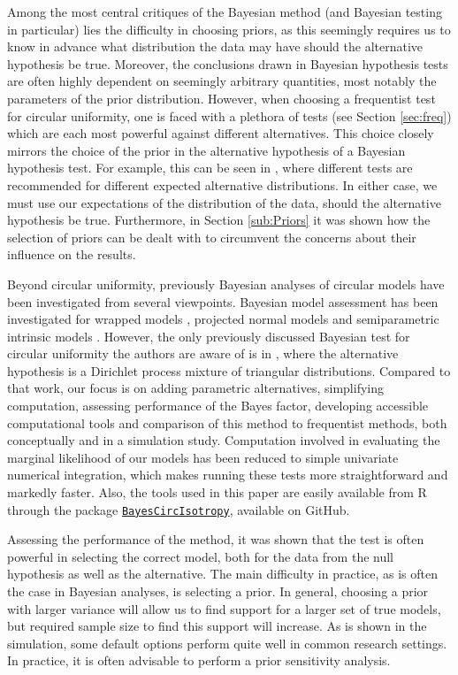 Among the most central critiques of the Bayesian method (and Bayesian testing in particular) lies the difficulty in choosing priors, as this seemingly requires us to know in advance what distribution the data may have should the alternative hypothesis be true. Moreover, the conclusions drawn in Bayesian hypothesis tests are often highly dependent on seemingly arbitrary quantities, most notably the parameters of the prior distribution. However, when choosing a frequentist test for circular uniformity, one is faced with a plethora of tests (see Section \ref{sec:freq}) which are each most powerful against different alternatives. This choice closely mirrors the choice of the prior in the alternative hypothesis of a Bayesian hypothesis test. For example, this can be seen in \citet{landler2018circular}, where different tests are recommended for different expected alternative distributions. In either case, we must use our expectations of the distribution of the data, should the alternative hypothesis be true. Furthermore, in Section \ref{sub:Priors} it was shown how the selection of priors can be dealt with to circumvent the concerns about their influence on the results. 

Beyond circular uniformity, previously Bayesian analyses of circular models have been investigated from several viewpoints. Bayesian model assessment has been investigated for wrapped models \citep{ravindran2011bayesian}, projected normal models \citep{nunez2015bayesian} and semiparametric intrinsic models \citep{bhattacharya2009bayesian, george2006semiparametric}. However, the only previously discussed Bayesian test for circular uniformity the authors are aware of is in \citet{mcvinish2008semiparametric}, where the alternative hypothesis is a Dirichlet process mixture of triangular distributions. Compared to that work, our focus is on adding parametric alternatives, simplifying computation, assessing performance of the Bayes factor, developing accessible computational tools and comparison of this method to frequentist methods, both conceptually and in a simulation study. Computation involved in evaluating the marginal likelihood of our models has been reduced to simple univariate numerical integration, which makes running these tests more straightforward and markedly faster. Also, the tools used in this paper are easily available from R through the package \href{https://github.com/LINK_BLINDED/BayesCircIsotropy}{\texttt{BayesCircIsotropy}}, available on GitHub.

Assessing the performance of the method, it was shown that the test is often powerful in selecting the correct model, both for the data from the null hypothesis as well as the alternative. The main difficulty in practice, as is often the case in Bayesian analyses, is selecting a prior. In general, choosing a prior with larger variance will allow us to find support for a larger set of true models, but required sample size to find this support will increase. As is shown in the simulation, some default options perform quite well in common research settings. In practice, it is often advisable to perform a prior sensitivity analysis.


